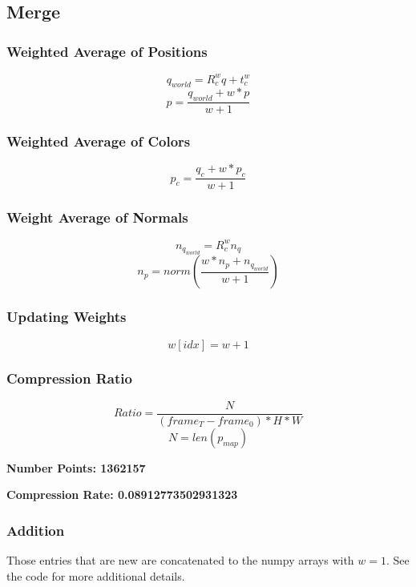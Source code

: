 \documentclass[12pt, a4paper]{article}
\begin{document}
\subsection{Merge}
\subsubsection{Weighted Average of Positions}
$$q_{world} = R_c^w q + t_c^w$$
$$p = \frac{q_{world} + w * p}{w + 1}$$

\subsubsection{Weighted Average of Colors}
$$p_c = \frac{q_c + w * p_c}{w + 1}$$

\subsubsection{Weight Average of Normals}
$$n_{q_{world}} = R_c^w n_{q}$$
$$n_p = norm(\frac{w * n_p + n_{q_{world}}}{w + 1})$$

\subsubsection{Updating Weights}
$$w[idx] = w + 1$$

\subsubsection{Compression Ratio}
$$Ratio = \frac{N}{(frame_{T} - frame_{0}) * H * W}$$
$$N = len(p_{map})$$

\textbf{Number Points: 1362157}

\textbf{Compression Rate: 0.08912773502931323}

\subsubsection{Addition}
Those entries that are new are concatenated to the numpy arrays with $w = 1$. See the code for more additional details.
\end{document}
